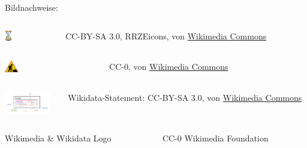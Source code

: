 \documentclass{beamer}
\begin{document}
\begin{frame}{Bildnachweise:}

  \begin{columns}[c]
    \begin{column}[T]{20mm}
      \includegraphics[height=0.5cm]{Hourglass_2.pdf}
    \end{column}
    \begin{column}[T]{90mm}
      CC-BY-SA 3.0, RRZEicons, von \href{https://commons.wikimedia.org/wiki/File:Hourglass_2.svg}{Wikimedia Commons}
    \end{column}
  \end{columns}

\vspace{5mm}
  \begin{columns}[c]
    \begin{column}[T]{20mm}
      \includegraphics[height=0.5cm]{Road-under-construction.png}
    \end{column}
    \begin{column}[T]{90mm}
      CC-0, von \href{https://commons.wikimedia.org/wiki/File:Road-under-construction.png}{Wikimedia Commons}
    \end{column}
  \end{columns}

\vspace{5mm}
  \begin{columns}[c]
    \begin{column}[T]{20mm}
      \includegraphics[width=20mm]{Wikidata_statement.pdf}
    \end{column}
    \begin{column}[T]{90mm}
      Wikidata-Statement: CC-BY-SA 3.0, von \href{https://commons.wikimedia.org/wiki/File:Wikidata_statement.svg}{Wikimedia Commons}
    \end{column}
  \end{columns}

\vspace{5mm}
  \begin{columns}[c]
    \begin{column}[T]{20mm}
      Wikimedia \& Wikidata Logo
    \end{column}
    \begin{column}[T]{90mm}
      CC-0 Wikimedia Foundation
    \end{column}
  \end{columns}

\end{frame}
\end{document}
